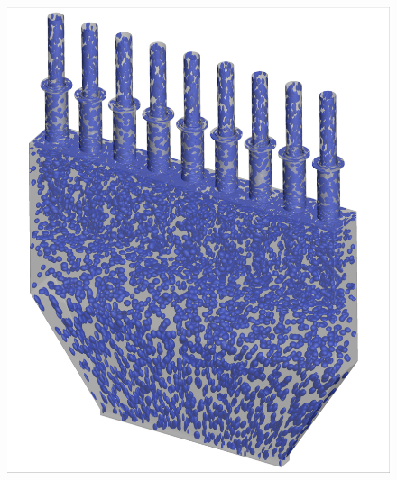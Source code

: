 \begin{figure}
	\begin{minipage}{0.49\linewidth}
		\includegraphics[width=0.99\linewidth,trim={0.3em 0.3em 0.3em 0.3em},clip]{Chapters/HPROMResults/Images/nineElem/deim/iblank/random_iblank_iso.png}
	\end{minipage}
	\begin{minipage}{0.49\linewidth}

\end{minipage}
\end{figure}
